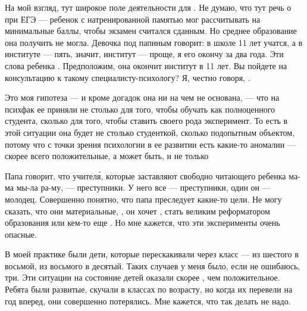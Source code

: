 На мой взгляд, тут широкое поле деятельности для . Не думаю, что тут речь о  при ЕГЭ --- ребенок с натренированной памятью мог рассчитывать на минимальные баллы, чтобы экзамен считался сданным. Но  среднее образование она получить не могла. Девочка под папиным  говорит: в школе 11 лет учатся, а в институте --- пять, значит, институт --- проще, я его окончу за два года. Эти слова ребенка  . Предположим, она окончит институт в 11 лет. Вы пойдете на консультацию к такому специалисту-психологу? Я, честно говоря, .

\begin{fancyquotes}
    Это моя гипотеза --- и кроме догадок она ни на чем не основана, --- что на психфак ее приняли не столько для того, чтобы обучать как полноценного студента, сколько для того, чтобы ставить своего рода эксперимент. То есть в этой ситуации она будет не столько студенткой, сколько подопытным объектом, потому что с точки зрения психологии в ее развитии есть какие-то аномалии --- скорее всего положительные, а может быть, и не только
\end{fancyquotes}

Папа говорит, что учител\'{я}, которые заставляют свободно читающего ребенка   ма-ма мы-ла ра-му, --- преступники. У него все --- преступники, один он --- молодец. Совершенно понятно, что папа преследует какие-то цели. Не могу сказать, что они материальные, , он хочет , стать великим реформатором образования или кем-то еще . Но мне кажется, что эти эксперименты очень опасные.

В моей практике были дети, которые перескакивали через класс --- из шестого в восьмой, из восьмого в десятый. Таких случаев у меня было, если не ошибаюсь, три. Эти ситуации на состояние детей оказали скорее , чем положительное. Ребята были развитые, скучали в классах по возрасту, но когда их перевели на год вперед, они совершенно потерялись. Мне кажется,  что так делать не надо.

